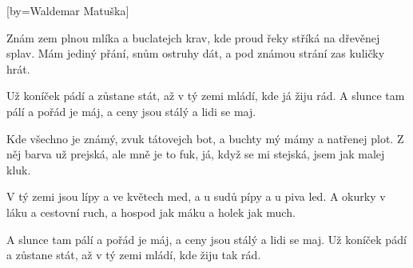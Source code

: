 [by={Waldemar Matuška}]

\beginverse{}
Znám zem plnou mlíka a buclatejch krav,
kde proud řeky stříká na dřevěnej splav.
Mám jediný přání, snům ostruhy dát,
a pod známou strání zas kuličky hrát.
\endverse{}

\beginchorus{}
Už koníček pádí a zůstane stát,
až v tý zemi mládí, kde já žiju rád.
A slunce tam pálí a pořád je máj,
a ceny jsou stálý a lidi se maj.
\endchorus{}

\beginverse{}
Kde všechno je známý, zvuk tátovejch bot,
a buchty mý mámy a natřenej plot.
Z něj barva už prejská, ale mně je to fuk,
já, když se mi stejská, jsem jak malej kluk.
\endverse{}

\beginchorus{}

\endchorus{}

\beginverse{}
V tý zemi jsou lípy a ve květech med,
a u sudů pípy a u piva led.
A okurky v láku a cestovní ruch,
a hospod jak máku a holek jak much.
\endverse{}

\beginchorus{}
A slunce tam pálí a pořád je máj,
a ceny jsou stálý a lidi se maj.
Už koníček pádí a zůstane stát,
až v tý zemi mládí, kde žiju tak rád.
\endchorus{}

\endsong{}
